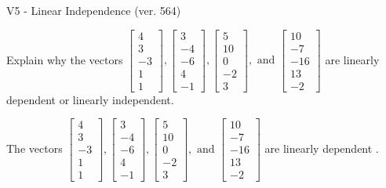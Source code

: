 \begin{exercise}
  \begin{exerciseTitle}V5 - Linear Independence (ver. 564)\end{exerciseTitle}
  \begin{exerciseStatement}
    Explain why the vectors \(\left[\begin{array}{r}
4 \\
3 \\
-3 \\
1 \\
1
\end{array}\right] , \left[\begin{array}{r}
3 \\
-4 \\
-6 \\
4 \\
-1
\end{array}\right] , \left[\begin{array}{r}
5 \\
10 \\
0 \\
-2 \\
3
\end{array}\right] , \text{ and } \left[\begin{array}{r}
10 \\
-7 \\
-16 \\
13 \\
-2
\end{array}\right]\) are linearly dependent or linearly independent.	


  \end{exerciseStatement}
  \begin{exerciseAnswer}
   The vectors \(\left[\begin{array}{r}
4 \\
3 \\
-3 \\
1 \\
1
\end{array}\right] , \left[\begin{array}{r}
3 \\
-4 \\
-6 \\
4 \\
-1
\end{array}\right] , \left[\begin{array}{r}
5 \\
10 \\
0 \\
-2 \\
3
\end{array}\right] , \text{ and } \left[\begin{array}{r}
10 \\
-7 \\
-16 \\
13 \\
-2
\end{array}\right]\) are 
  	 linearly dependent  .
  


  \end{exerciseAnswer}
\end{exercise}
